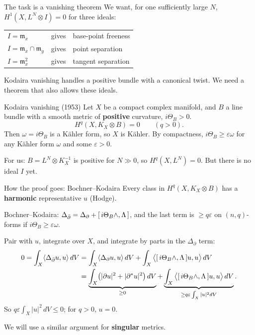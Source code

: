 \begin{frame}{The task is a vanishing theorem}
We want, for one sufficiently large \(N\),
\(H^1(X,L^N\otimes I)=0\) for three ideals:
\begin{center}
\renewcommand{\arraystretch}{1.6}
\begin{tabular}{lll}
\(I=\mathfrak m_x\) & gives & base-point freeness\\
\(I=\mathfrak m_x\cap\mathfrak m_y\) & gives & point separation\\
\(I=\mathfrak m_x^2\) & gives & tangent separation
\end{tabular}
\end{center}
Kodaira vanishing handles a positive bundle with a canonical twist.
We need a theorem that also allows these ideals.
\end{frame}

\begin{frame}{Kodaira vanishing (1953)}
Let \(X\) be a compact complex manifold, and \(B\) a line bundle with a smooth metric of \textbf{positive} curvature, \(i\Theta_B>0\).
\[
\boxed{H^q(X,K_X\otimes B)=0\qquad(q>0).}
\]
Then \(\omega=i\Theta_B\) is a Kähler form, so \(X\) is Kähler.
By compactness, \(i\Theta_B\ge\varepsilon\omega\) for any Kähler form \(\omega\) and some \(\varepsilon>0\).
\par\medskip
For us: \(B=L^N\otimes K_X^{-1}\) is positive for \(N\gg0\), so \(H^q(X,L^N)=0\).
But there is no ideal \(I\) yet.
\end{frame}

\begin{frame}{How the proof goes: Bochner--Kodaira}
Every class in \(H^q(X,K_X\otimes B)\) has a \textbf{harmonic} representative \(u\) (Hodge).
\par\medskip
Bochner--Kodaira: \(\Delta_{\bar\partial}=\Delta_{\partial}+[\,i\Theta_B\wedge,\Lambda\,]\),
and the last term is \(\ge q\varepsilon\) on \((n,q)\)-forms if \(i\Theta_B\ge\varepsilon\omega\).
\par\medskip
Pair with \(u\), integrate over \(X\), and integrate by parts in the \(\Delta_\partial\) term:
\[
\begin{aligned}
0=\int_X\langle\Delta_{\bar\partial}u,u\rangle\,dV
&=\int_X\langle\Delta_{\partial}u,u\rangle\,dV+\int_X\big\langle[\,i\Theta_B\wedge,\Lambda\,]u,u\big\rangle\,dV\\
&=\underbrace{\int_X\bigl(|\partial u|^2+|\partial^*u|^2\bigr)\,dV}_{\ge0}
+\underbrace{\int_X\big\langle[\,i\Theta_B\wedge,\Lambda\,]u,u\big\rangle\,dV}_{\ge q\varepsilon\int_X|u|^2dV}.
\end{aligned}
\]
So \(q\varepsilon\int_X|u|^2\,dV\le0\); for \(q>0\), \(u=0\).
\par\medskip
We will use a similar argument for \textbf{singular} metrics.
\end{frame}


